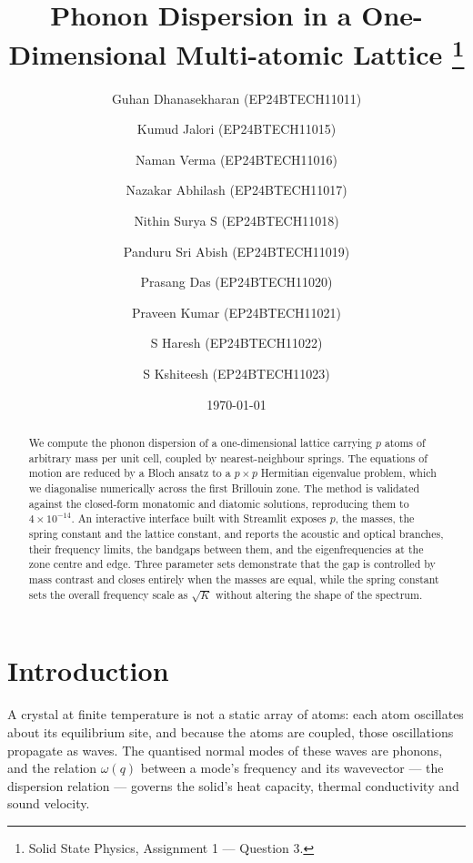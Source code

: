 \documentclass[aps,prb,reprint,nofootinbib]{revtex4-2}
\begin{document}
\title{Phonon Dispersion in a One-Dimensional Multi-atomic Lattice%
\thanks{Solid State Physics, Assignment 1 --- Question 3.}}

\author{Guhan Dhanasekharan\,\,(EP24BTECH11011)}
\author{Kumud Jalori\,\,(EP24BTECH11015)}
\author{Naman Verma\,\,(EP24BTECH11016)}
\author{Nazakar Abhilash\,\,(EP24BTECH11017)}
\author{Nithin Surya S\,\,(EP24BTECH11018)}
\author{Panduru Sri Abish\,\,(EP24BTECH11019)}
\author{Prasang Das\,\,(EP24BTECH11020)}
\author{Praveen Kumar\,\,(EP24BTECH11021)}
\author{S Haresh\,\,(EP24BTECH11022)}
\author{S Kshiteesh\,\,(EP24BTECH11023)}

\date{\today}

\begin{abstract}
We compute the phonon dispersion of a one-dimensional lattice carrying $p$ atoms of arbitrary
mass per unit cell, coupled by nearest-neighbour springs. The equations of motion are reduced by
a Bloch ansatz to a $p \times p$ Hermitian eigenvalue problem, which we diagonalise numerically
across the first Brillouin zone. The method is validated against the closed-form monatomic and
diatomic solutions, reproducing them to $4 \times 10^{-14}$. An interactive interface built with
Streamlit exposes $p$, the masses, the spring constant and the lattice constant, and reports the
acoustic and optical branches, their frequency limits, the bandgaps between them, and the
eigenfrequencies at the zone centre and edge. Three parameter sets demonstrate that the gap is
controlled by mass contrast and closes entirely when the masses are equal, while the spring
constant sets the overall frequency scale as $\sqrt{K}$ without altering the shape of the
spectrum.
\end{abstract}

\maketitle

\section{Introduction}

A crystal at finite temperature is not a static array of atoms: each atom oscillates about its
equilibrium site, and because the atoms are coupled, those oscillations propagate as waves. The
quantised normal modes of these waves are phonons, and the relation $\omega(q)$ between a mode's
frequency and its wavevector --- the dispersion relation --- governs the solid's heat capacity,
thermal conductivity and sound velocity.
\end{document}

